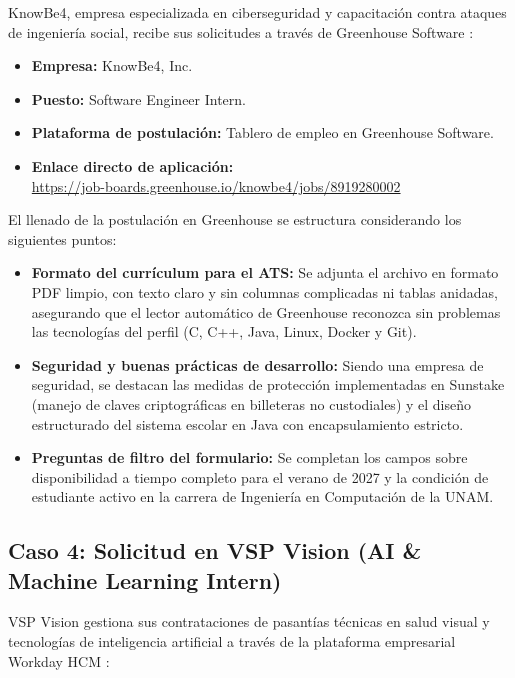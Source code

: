 \documentclass[12pt]{article}
\begin{document}
KnowBe4, empresa especializada en ciberseguridad y capacitación contra ataques de ingeniería social, recibe sus solicitudes a través de Greenhouse Software \parencite{greenhouse2026software}:

\begin{itemize}[leftmargin=0.2in, itemsep=0.2em]
    \item \textbf{Empresa:} KnowBe4, Inc.
    \item \textbf{Puesto:} Software Engineer Intern.
    \item \textbf{Plataforma de postulación:} Tablero de empleo en Greenhouse Software.
    \item \textbf{Enlace directo de aplicación:}\\ {\footnotesize\url{https://job-boards.greenhouse.io/knowbe4/jobs/8919280002}}
\end{itemize}

El llenado de la postulación en Greenhouse se estructura considerando los siguientes puntos:
\begin{itemize}[leftmargin=0.2in, itemsep=0.3em]
    \item \textbf{Formato del currículum para el ATS:} Se adjunta el archivo en formato PDF limpio, con texto claro y sin columnas complicadas ni tablas anidadas, asegurando que el lector automático de Greenhouse reconozca sin problemas las tecnologías del perfil (C, C++, Java, Linux, Docker y Git).
    \item \textbf{Seguridad y buenas prácticas de desarrollo:} Siendo una empresa de seguridad, se destacan las medidas de protección implementadas en Sunstake (manejo de claves criptográficas en billeteras no custodiales) y el diseño estructurado del sistema escolar en Java con encapsulamiento estricto.
    \item \textbf{Preguntas de filtro del formulario:} Se completan los campos sobre disponibilidad a tiempo completo para el verano de 2027 y la condición de estudiante activo en la carrera de Ingeniería en Computación de la UNAM.
\end{itemize}

\subsection{Caso 4: Solicitud en VSP Vision (AI \& Machine Learning Intern)}
\label{sec:casoVspVision}

VSP Vision gestiona sus contrataciones de pasantías técnicas en salud visual y tecnologías de inteligencia artificial a través de la plataforma empresarial Workday HCM \parencite{workday2026hcm}:
\end{document}

